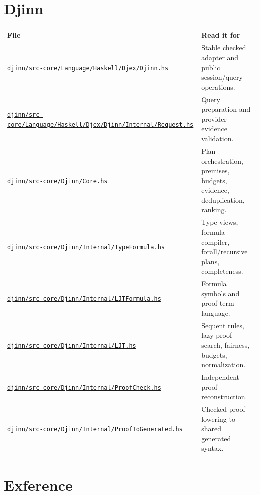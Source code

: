 \documentclass[10pt,letterpaper,oneside]{report}
\def\DjexBase{https://github.com/VladimirReshetnikov/Djex/blob/e454757d53ec057238c22fc6cd0d935b7d96b3dc/}
\newcommand{\dpath}[1]{\href{\DjexBase#1}{\nolinkurl{#1}}}
\begin{document}
\section{Djinn}

\begin{longtable}{@{}L{0.46\textwidth}L{0.46\textwidth}@{}}
\toprule
\textbf{File} & \textbf{Read it for} \\
\midrule
\endhead
\dpath{djinn/src-core/Language/Haskell/Djex/Djinn.hs} & Stable checked adapter and public session/query operations. \\
\dpath{djinn/src-core/Language/Haskell/Djex/Djinn/Internal/Request.hs} & Query preparation and provider evidence validation. \\
\dpath{djinn/src-core/Djinn/Core.hs} & Plan orchestration, premises, budgets, evidence, deduplication, ranking. \\
\dpath{djinn/src-core/Djinn/Internal/TypeFormula.hs} & Type views, formula compiler, forall/recursive plans, completeness. \\
\dpath{djinn/src-core/Djinn/Internal/LJTFormula.hs} & Formula symbols and proof-term language. \\
\dpath{djinn/src-core/Djinn/Internal/LJT.hs} & Sequent rules, lazy proof search, fairness, budgets, normalization. \\
\dpath{djinn/src-core/Djinn/Internal/ProofCheck.hs} & Independent proof reconstruction. \\
\dpath{djinn/src-core/Djinn/Internal/ProofToGenerated.hs} & Checked proof lowering to shared generated syntax. \\
\bottomrule
\end{longtable}

\section{Exference}
\end{document}
